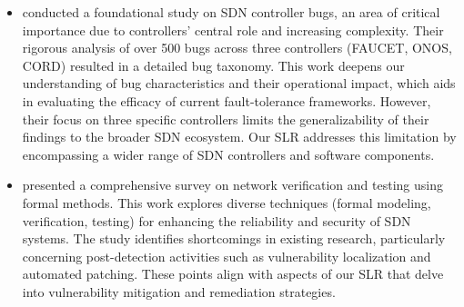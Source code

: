 \begin{itemize}
    \item \textbf{\cite{9505089}} conducted a foundational study on SDN controller bugs, an area of critical importance due to controllers' central role and increasing complexity. Their rigorous analysis of over 500 bugs across three controllers (FAUCET, ONOS, CORD) resulted in a detailed bug taxonomy. This work deepens our understanding of bug characteristics and their operational impact, which aids in evaluating the efficacy of current fault-tolerance frameworks. However, their focus on three specific controllers limits the generalizability of their findings to the broader SDN ecosystem. Our SLR addresses this limitation by encompassing a wider range of SDN controllers and software components.

    \item \textbf{\cite{8453007}} presented a comprehensive survey on network verification and testing using formal methods. This work explores diverse techniques (formal modeling, verification, testing) for enhancing the reliability and security of SDN systems. The study identifies shortcomings in existing research, particularly concerning post-detection activities such as vulnerability localization and automated patching. These points align with aspects of our SLR that delve into vulnerability mitigation and remediation strategies.
    

\end{itemize}
